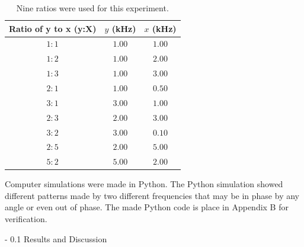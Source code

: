 \documentclass[twoside]{article}
\makeatletter
\renewcommand\section{\@startsection
   {section}{1}{0pt}%
   {-\baselineskip}%
   {0.1\baselineskip}%
   {\normalfont\large\bfseries}}%
\makeatother
\begin{document}
\captionsetup[table]{width=4in}
\begin{table}[h!]
\centering
\caption{Nine ratios were used for this experiment.}
\begin{tabular}{||c|c|c||}
\hline
Ratio of y to x (y:X) & $y$ (kHz) & $x$ (kHz) \\ \hline \hline
$1:1$ & $1.00$ & $1.00$ \\ \hline
$1:2$ & $1.00$ & $2.00$ \\ \hline
$1:3$ & $1.00$ & $3.00$ \\ \hline
$2:1$ & $1.00$ & $0.50$ \\ \hline
$3:1$ & $3.00$ & $1.00$ \\ \hline
$2:3$ & $2.00$ & $3.00$ \\ \hline
$3:2$ & $3.00$ & $0.10$ \\ \hline
$2:5$ & $2.00$ & $5.00$ \\ \hline
$5:2$ & $5.00$ & $2.00$ \\ \hline
\end{tabular}
\label{tab:mytab}
\end{table}


Computer simulations were made in Python. The Python simulation showed different patterns made by two different frequencies that may be in phase by any angle or even out of phase. The made Python code is place in Appendix B for verification.

\section{Results and Discussion}
\label{sec:rnd}
\end{document}
